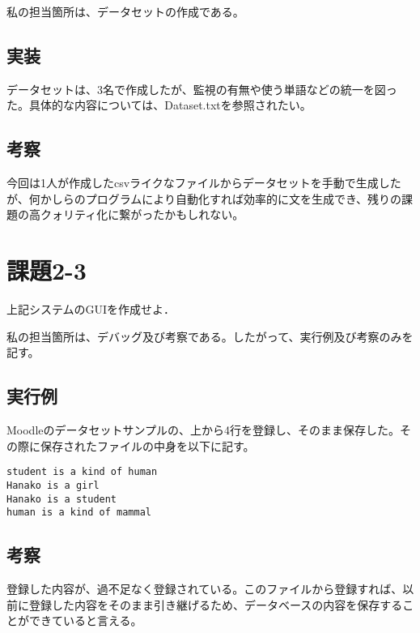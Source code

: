 \documentclass{jarticle}
\begin{document}
私の担当箇所は、データセットの作成である。

\subsection{実装}
データセットは、3名で作成したが、監視の有無や使う単語などの統一を図った。具体的な内容については、Dataset.txtを参照されたい。

\subsection{考察}
今回は1人が作成したcsvライクなファイルからデータセットを手動で生成したが、何かしらのプログラムにより自動化すれば効率的に文を生成でき、残りの課題の高クォリティ化に繋がったかもしれない。


\section{課題2-3}
\begin{screen}
  上記システムのGUIを作成せよ．
\end{screen}

私の担当箇所は、デバッグ及び考察である。したがって、実行例及び考察のみを記す。

\subsection{実行例}

Moodleのデータセットサンプルの、上から4行を登録し、そのまま保存した。その際に保存されたファイルの中身を以下に記す。

\begin{lstlisting}
student is a kind of human
Hanako is a girl
Hanako is a student
human is a kind of mammal
\end{lstlisting}

\subsection{考察}
  登録した内容が、過不足なく登録されている。このファイルから登録すれば、以前に登録した内容をそのまま引き継げるため、データベースの内容を保存することができていると言える。
\end{document}
